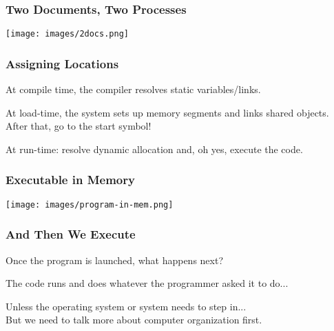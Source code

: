 \begin{frame}
	\frametitle{Two Documents, Two Processes}

	\begin{center}
		\texttt{[image: images/2docs.png]}
	\end{center}


\end{frame}

\begin{frame}
\frametitle{Assigning Locations}

At compile time, the compiler resolves static variables/links.

At load-time, the system sets up memory segments and links shared objects.\\
\quad After that, go to the start symbol!

At run-time: resolve dynamic allocation and, oh yes, execute the code.

\end{frame}

\begin{frame}
\frametitle{Executable in Memory}

\begin{center}
  \texttt{[image: images/program-in-mem.png]}
\end{center}

\end{frame}

\begin{frame}
\frametitle{And Then We Execute}

Once the program is launched, what happens next?

The code runs and does whatever the programmer asked it to do...

Unless the operating system or system needs to step in...\\
\quad But we need to talk more about computer organization first.

\end{frame}



